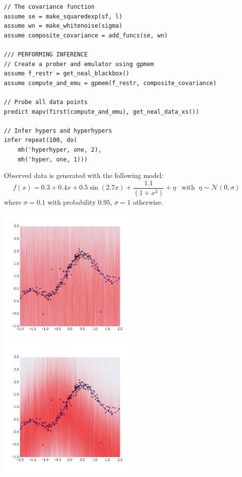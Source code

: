 \documentclass[a0,portrait]{a0poster}
\begin{document}
\begin{multicols}{3}
\begin{minipage}{\linewidth}
\begin{lstlisting}[frame=single,caption=Hierarchical  GP Smoothing,mathescape,label=alg:gphierarch]
// The covariance function
assume se = make_squaredexp(sf, l)
assume wn = make_whitenoise(sigma)
assume composite_covariance = add_funcs(se, wn)

/// PERFORMING INFERENCE
// Create a prober and emulator using gpmem
assume f_restr = get_neal_blackbox()
assume compute_and_emu = gpmem(f_restr, composite_covariance)

// Probe all data points
predict mapv(first(compute_and_emu), get_neal_data_xs())

// Infer hypers and hyperhypers
infer repeat(100, do(
    mh('hyperhyper, one, 2),
    mh('hyper, one, 1)))

\end{lstlisting}
\end{minipage}
Observed data is generated with the following model: 
\begin{equation*}
f(x) =  0.3 + 0.4 x + 0.5 \sin(2.7x) + \frac{1.1}{(1+ x^2)} + \eta \;\;\; \text{with}\;\;\eta \sim \mathcal{N}(0,\sigma)
\end{equation*} where $\sigma = 0.1$ with probability $0.95$, $\sigma = 1$ otherwise.
\begin{center}
\includegraphics[width=7cm]{neal_se_1final.png}
\includegraphics[width=7cm]{neal_se_2final.png}

\end{center}
\end{multicols}
\end{document}
